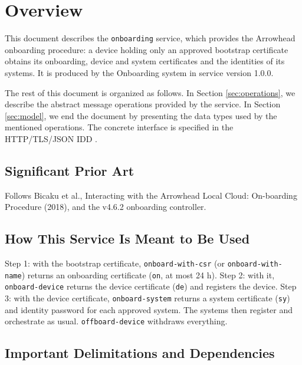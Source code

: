 \documentclass[a4paper]{arrowhead}
\begin{document}
\section{Overview}
\label{sec:overview}

This document describes the \texttt{onboarding} service, which provides the Arrowhead onboarding procedure: a device holding only an approved bootstrap certificate obtains its onboarding, device and system certificates and the identities of its systems.
It is produced by the Onboarding system \cite{onb-sysd} in service version 1.0.0.

The rest of this document is organized as follows.
In Section \ref{sec:operations}, we describe the abstract message operations provided by the service.
In Section \ref{sec:model}, we end the document by presenting the data types used by the mentioned operations.
The concrete interface is specified in the HTTP/TLS/JSON IDD \cite{onb-onboarding-http-idd}.

\subsection{Significant Prior Art}

Follows Bicaku et al., Interacting with the Arrowhead Local Cloud: On-boarding Procedure (2018), and the v4.6.2 onboarding controller.

\subsection{How This Service Is Meant to Be Used}

Step 1: with the bootstrap certificate, \texttt{onboard-\allowbreak{}with-\allowbreak{}csr} (or \texttt{onboard-\allowbreak{}with-\allowbreak{}name}) returns an onboarding certificate (\texttt{on}, at most 24 h). Step 2: with it, \texttt{onboard-\allowbreak{}device} returns the device certificate (\texttt{de}) and registers the device. Step 3: with the device certificate, \texttt{onboard-\allowbreak{}system} returns a system certificate (\texttt{sy}) and identity password for each approved system. The systems then register and orchestrate as usual. \texttt{offboard-\allowbreak{}device} withdraws everything.

\subsection{Important Delimitations and Dependencies}
\label{sec:delimitations}
\end{document}
